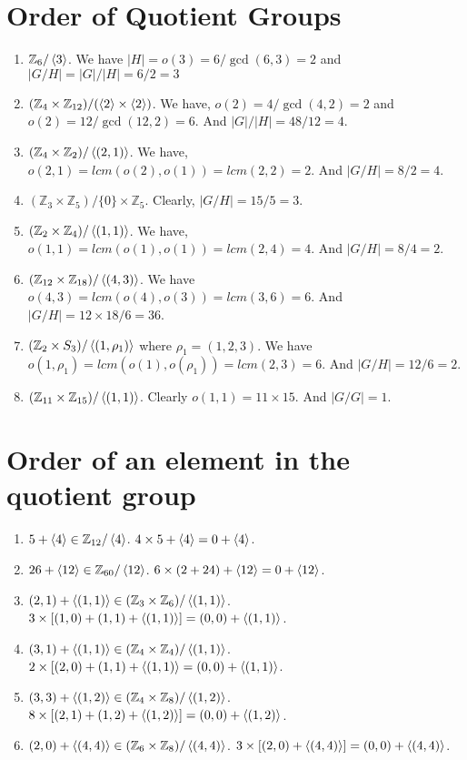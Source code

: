\section{Order of Quotient Groups}
\begin{enumerate}
	\item $\mathbb{Z}_6/\left\langle 3 \right\rangle$.
	We have $|H| = o(3) = 6/\gcd(6,3) = 2$ and $|G/H| = |G|/|H| = 6/2 = 3$
	\item $(\mathbb{Z}_4 \times \mathbb{Z}_{12})/(\left\langle 2 \right\rangle \times \left\langle 2 \right\rangle)$.
	We have, $o(2)=4/\gcd(4,2) = 2$ and $o(2) = 12/\gcd(12,2) = 6$. And $|G|/|H| = 48/12 = 4$.
	\item $(\mathbb{Z}_4 \times \mathbb{Z}_2)/\left\langle (2,1) \right\rangle$.
	We have, $o(2,1) = lcm(o(2),o(1)) = lcm(2,2) = 2$. And $|G/H| = 8/2 = 4$.
	\item $(\mathbb{Z}_3 \times \mathbb{Z}_5)/\{0\} \times \mathbb{Z}_5$.
	Clearly, $|G/H| = 15/5 = 3$.
	\item $(\mathbb{Z}_2 \times \mathbb{Z}_4)/\left\langle (1,1) \right\rangle$.
	We have, $o(1,1) = lcm(o(1),o(1)) = lcm(2,4) = 4$. And $|G/H| = 8/4 = 2$.
	\item $(\mathbb{Z}_{12} \times \mathbb{Z}_{18})/\left\langle (4,3) \right\rangle$.
	We have $o(4,3) = lcm(o(4),o(3)) = lcm(3,6) = 6$. And $|G/H| = 12 \times 18/6 = 36$.
	\item $(\mathbb{Z}_2 \times S_3)/\left\langle (1,\rho_1) \right\rangle$ where $\rho_1 = (1,2,3)$.
	We have $o(1,\rho_1) = lcm(o(1),o(\rho_1)) = lcm(2,3) = 6$. And $|G/H| = 12/6 = 2$.
	\item $(\mathbb{Z}_{11} \times \mathbb{Z}_{15})/\left\langle (1,1) \right\rangle$.
	Clearly $o(1,1) = 11 \times 15$. And $|G/G| = 1$.
\end{enumerate}

\section{Order of an element in the quotient group}
\begin{enumerate}
	\item $5+\left\langle 4 \right\rangle \in \mathbb{Z}_{12}/\left\langle 4 \right\rangle$.
	$4 \times 5+\left\langle 4 \right\rangle = 0+\left\langle 4 \right\rangle$.
	\item $26+\left\langle 12 \right\rangle \in \mathbb{Z}_{60}/\left\langle 12 \right\rangle$.
	$6 \times (2+24)+\left\langle 12 \right\rangle = 0 + \left\langle 12 \right\rangle$.	
	\item $(2,1)+\left\langle (1,1) \right\rangle \in (\mathbb{Z}_3 \times \mathbb{Z}_6)/\left\langle (1,1) \right\rangle$.
	$3 \times [(1,0)+(1,1)+\left\langle (1,1) \right\rangle] = (0,0) + \left\langle (1,1) \right\rangle$.
	\item $(3,1)+\left\langle (1,1) \right\rangle \in (\mathbb{Z}_4 \times \mathbb{Z}_4)/\left\langle (1,1) \right\rangle$.
	$2 \times [(2,0)+(1,1)+\left\langle (1,1) \right\rangle = (0,0) + \left\langle (1,1) \right\rangle$.
	\item $(3,3) + \left\langle (1,2) \right\rangle \in (\mathbb{Z}_4 \times \mathbb{Z}_8)/\left\langle (1,2) \right\rangle$.
	$8 \times [(2,1) + (1,2)+\left\langle (1,2) \right\rangle] = (0,0) + \left\langle (1,2) \right\rangle$.
	\item $(2,0) + \left\langle (4,4) \right\rangle \in (\mathbb{Z}_6 \times \mathbb{Z}_8)/\left\langle (4,4) \right\rangle$.
	$3 \times [(2,0)+\left\langle (4,4) \right\rangle] = (0,0) + \left\langle (4,4) \right\rangle$.
\end{enumerate}

